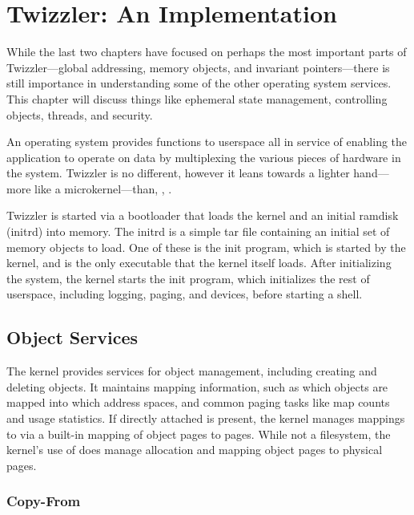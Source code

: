 
\chapter{Twizzler: An Implementation}\label{ch:twizzler}


\begin{chabstract}
    While the last two chapters have focused on perhaps the most important parts of Twizzler---global addressing, memory
    objects, and invariant pointers---there is still importance in understanding some of the other operating system
    services. This chapter will discuss things like ephemeral state management, controlling objects, threads, and security.
\end{chabstract}

An operating system provides functions to userspace all in service of enabling the application to operate on
data by multiplexing the various pieces of hardware in the system. Twizzler is no different, however it
leans towards a lighter hand---more like a microkernel---than, \eg, \unix.

Twizzler is started via a bootloader that loads the kernel and an initial ramdisk (initrd) into memory. The initrd is a
simple tar file containing an initial set of memory objects to load. One of these is the init program, which is started
by the kernel, and is the only executable that the kernel itself loads. After initializing the system, the kernel starts
the init program, which initializes the rest of userspace, including logging, paging, and devices, before starting a shell.

\section{Object Services}

The kernel provides services for object management, including creating and deleting objects. It maintains mapping
information, such as which objects are mapped into which address spaces, and common paging tasks like map counts and
usage statistics. If directly attached \NVM is present, the kernel manages mappings to \NVM via a built-in
mapping of object pages to \NVM pages. While not a filesystem, the kernel's use of \NVM does manage allocation and
mapping object pages to physical pages.

\subsection{Copy-From}


